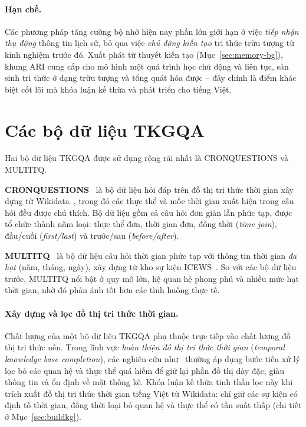 \paragraph{Hạn chế.} Các phương pháp tăng cường bộ nhớ hiện nay phần lớn giới hạn ở việc
\emph{tiếp nhận thụ động} thông tin lịch sử, bỏ qua việc \emph{chủ động kiến tạo} tri thức trừu
tượng từ kinh nghiệm trước đó. Xuất phát từ thuyết kiến tạo (Mục~\ref{sec:memory-bg}), khung ARI
cung cấp cho mô hình một quá trình học chủ động và liên tục, sản sinh tri thức ở dạng trừu tượng và
tổng quát hóa được -- đây chính là điểm khác biệt cốt lõi mà khóa luận kế thừa và phát triển cho
tiếng Việt.

\section{Các bộ dữ liệu TKGQA}
\label{sec:datasets}

Hai bộ dữ liệu TKGQA được sử dụng rộng rãi nhất là CRONQUESTIONS và MULTITQ.

\textbf{CRONQUESTIONS}~\cite{saxena2021cronkgqa} là bộ dữ liệu hỏi đáp trên đồ thị tri thức thời
gian xây dựng từ Wikidata~\cite{vrandecic2014wikidata}, trong đó các thực thể và mốc thời gian xuất
hiện trong câu hỏi đều được chú thích. Bộ dữ liệu gồm cả câu hỏi đơn giản lẫn phức tạp, được tổ
chức thành năm loại: thực thể đơn, thời gian đơn, đồng thời (\textit{time join}), đầu/cuối
(\textit{first/last}) và trước/sau (\textit{before/after}).

\textbf{MULTITQ}~\cite{chen2023multitq} là bộ dữ liệu câu hỏi thời gian phức tạp với thông tin thời
gian \emph{đa hạt} (năm, tháng, ngày), xây dựng từ kho sự kiện ICEWS~\cite{boschee2015icews}. So
với các bộ dữ liệu trước, MULTITQ nổi bật ở quy mô lớn, hệ quan hệ phong phú và nhiều mức hạt thời
gian, nhờ đó phản ánh tốt hơn các tình huống thực tế.

\paragraph{Xây dựng và lọc đồ thị tri thức thời gian.} Chất lượng của một bộ dữ liệu TKGQA phụ
thuộc trực tiếp vào chất lượng đồ thị tri thức nền. Trong lĩnh vực \textit{hoàn thiện đồ thị tri
thức thời gian} (\textit{temporal knowledge base completion}), các nghiên cứu như~\cite{lacroix2020tkbc}
thường áp dụng bước tiền xử lý lọc bỏ các quan hệ và thực thể quá hiếm để giữ lại phần đồ thị dày
đặc, giàu thông tin và ổn định về mặt thống kê. Khóa luận kế thừa tinh thần lọc này khi trích xuất
đồ thị tri thức thời gian tiếng Việt từ Wikidata: chỉ giữ các sự kiện có định tố thời gian, đồng
thời loại bỏ quan hệ và thực thể có tần suất thấp (chi tiết ở Mục~\ref{sec:buildkg}).

